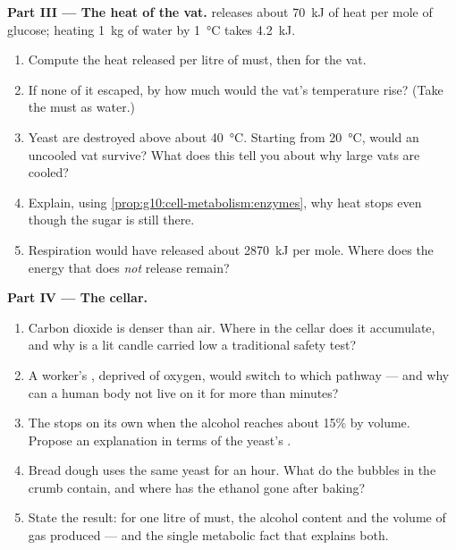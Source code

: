\begin{problem}
\medskip
\noindent\textbf{Part III --- The heat of the vat.}
 releases about \qty{70}{kJ} of heat per mole of glucose;
heating \qty{1}{kg} of water by \qty{1}{\celsius} takes \qty{4.2}{kJ}.
\begin{enumerate}[resume]
  \item Compute the heat released per litre of must, then for the
        vat.
  \item If none of it escaped, by how much would the vat's temperature
        rise? (Take the must as water.)
  \item Yeast  are destroyed above about \qty{40}{\celsius}.
        Starting from \qty{20}{\celsius}, would an uncooled vat
        survive? What does this tell you about why large vats are
        cooled?
  \item Explain, using \cref{prop:g10:cell-metabolism:enzymes}, why
        heat stops  even though the sugar is still there.
  \item Respiration would have released about \qty{2870}{kJ} per mole.
        Where does the energy that  does \emph{not}
        release remain?
\end{enumerate}

\medskip
\noindent\textbf{Part IV --- The cellar.}
\begin{enumerate}[resume]
  \item Carbon dioxide is denser than air. Where in the cellar does it
        accumulate, and why is a lit candle carried low a traditional
        safety test?
  \item A worker's , deprived of oxygen, would switch to which
        pathway --- and why can a human body not live on it for more
        than minutes?
  \item The  stops on its own when the alcohol reaches
        about 15\% by volume. Propose an explanation in terms of the
        yeast's .
  \item Bread dough uses the same yeast for an hour. What do the
        bubbles in the crumb contain, and where has the ethanol gone
        after baking?
  \item State the result: for one litre of must, the alcohol content
        and the volume of gas produced --- and the single metabolic
        fact that explains both.
\end{enumerate}
\end{problem}
